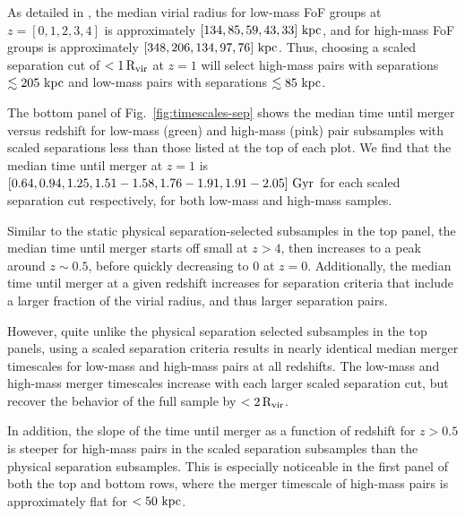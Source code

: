 \documentclass[twocolumn,linenumbers]{aastex631}
\newcommand{\kc}[1]{\textcolor{yellow}{\textbf{kc: #1}} }
\newcommand{\chambe}{\citet{Chamberlain2024}}
\begin{document}
        As detailed in \chambe{}, the median virial radius for low-mass FoF groups at $z=[0,1,2,3,4]$ is approximately $[134, 85, 59, 43, 33]\,\mathrm{\,kpc}$, and for high-mass FoF groups is approximately $[348, 206, 134, 97, 76]\,\mathrm{\,kpc}$.
        Thus, choosing a scaled separation cut of $<1\,\rm R_{vir}$ at $z=1$ will select high-mass pairs with separations $\lesssim205\,\mathrm{\,kpc}$ and low-mass pairs with separations $\lesssim85\,\mathrm{\,kpc}$.
        
        The bottom panel of Fig.~\ref{fig:timescales-sep} shows the median time until merger versus redshift for low-mass (green) and high-mass (pink) pair subsamples with scaled separations less than those listed at the top of each plot. 
        We find that the median time until merger at $z=1$ is $[0.64, 0.94,1.25,1.51-1.58,1.76-1.91,1.91-2.05]\,\mathrm{\,Gyr}$ for each scaled separation cut respectively, for both low-mass and high-mass samples. %
        
        Similar to the static physical separation-selected subsamples in the top panel, the median time until merger starts off small at $z>4$, then increases to a peak around $z\sim0.5$, before quickly decreasing to 0 at $z=0$. 
        Additionally, the median time until merger at a given redshift increases for separation criteria that include a larger fraction of the virial radius, and thus larger separation pairs. 
        
        However, quite unlike the physical separation selected subsamples in the top panels, using a scaled separation criteria results in nearly identical median merger timescales for low-mass and high-mass pairs at all redshifts.
        The low-mass and high-mass merger timescales increase with each larger scaled separation cut, but recover the behavior of the full sample by $<2\,\rm R_{vir}$.
        
        In addition, the slope of the time until merger as a function of redshift for $z>0.5$ is steeper for high-mass pairs in the scaled separation subsamples than the physical separation subsamples.
        This is especially noticeable in the first panel of both the top and bottom rows, where the merger timescale of high-mass pairs is approximately flat for $<50\,\mathrm{\,kpc}$. 

\end{document}
